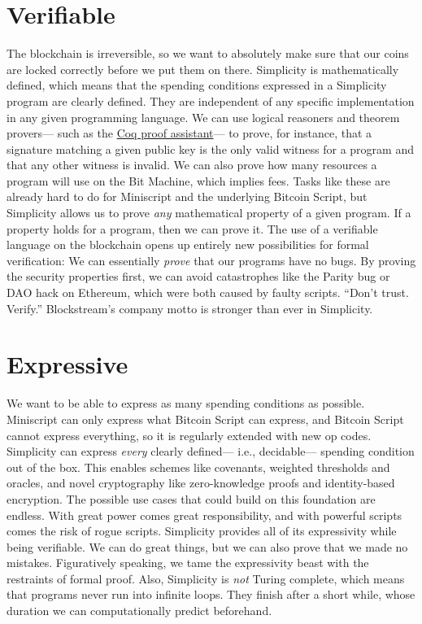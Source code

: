 
\section{Verifiable}

The blockchain is irreversible,
so we want to absolutely make sure that our coins are locked correctly before we put them on there.
Simplicity is mathematically defined,
which means that the spending conditions expressed in a Simplicity program are clearly defined.
They are independent of any specific implementation in any given programming language.
We can use logical reasoners and theorem provers---%
such as the \href{https://coq.inria.fr/}{Coq proof assistant}---%
to prove,
for instance,
that a signature matching a given public key is the only valid witness for a program
and that any other witness is invalid.
We can also prove how many resources a program will use on the Bit Machine,
which implies fees.
Tasks like these are already hard to do for Miniscript and the underlying Bitcoin Script,
but Simplicity allows us to prove \emph{any} mathematical property of a given program.
If a property holds for a program,
then we can prove it.
The use of a verifiable language on the blockchain opens up entirely new possibilities for formal verification:
We can essentially \emph{prove} that our programs have no bugs.
By proving the security properties first,
we can avoid catastrophes like the Parity bug or DAO hack on Ethereum,
which were both caused by faulty scripts.
%
\enquote{Don't trust. Verify.}
Blockstream's company motto is stronger than ever in Simplicity.

\section{Expressive}

We want to be able to express as many spending conditions as possible.
Miniscript can only express what Bitcoin Script can express,
and Bitcoin Script cannot express everything,
so it is regularly extended with new op codes.
Simplicity can express \emph{every} clearly defined---%
i.e., decidable---%
spending condition out of the box.
This enables schemes like covenants, weighted thresholds and oracles,
and novel cryptography like zero-knowledge proofs and identity-based encryption.
The possible use cases that could build on this foundation are endless.
%
With great power comes great responsibility,
and with powerful scripts comes the risk of rogue scripts.
Simplicity provides all of its expressivity while being verifiable.
We can do great things, but we can also prove that we made no mistakes.
Figuratively speaking,
we tame the expressivity beast with the restraints of formal proof.
%
Also,
Simplicity is \emph{not} Turing complete,
which means that programs never run into infinite loops.
They finish after a short while,
whose duration we can computationally predict beforehand.

